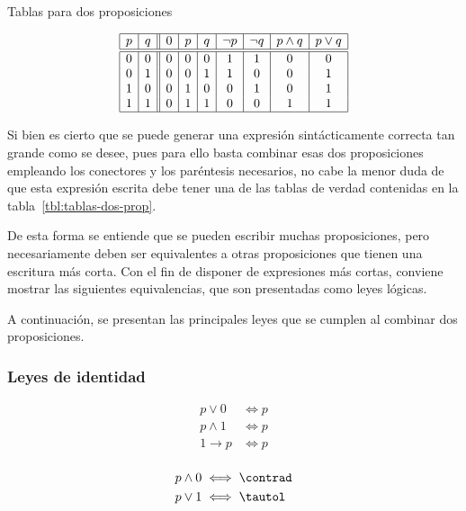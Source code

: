 \begin{table}[h]%
  \caption{Tablas para dos proposiciones}
  \label{tbl:tablas-dos-prop}%
  \centering
  $$
    \begin{array}{|c|c||c|c|c|c|c|c|c|}
      \hline
      p & q & 0 & p & q & \neg p & \neg q & p \land q & p \lor q \\
      \hline
      \hline
      0 & 0 & 0 & 0 & 0 & 1 & 1 & 0 & 0 \\
      0 & 1 & 0 & 0 & 1 & 1 & 0 & 0 & 1 \\
      1 & 0 & 0 & 1 & 0 & 0 & 1 & 0 & 1 \\
      1 & 1 & 0 & 1 & 1 & 0 & 0 & 1 & 1 \\
      \hline
    \end{array}
  $$
\end{table}

Si bien es cierto que se puede generar una expresión sintácticamente
correcta tan grande como se desee, pues para ello basta combinar esas dos
proposiciones empleando los conectores y los paréntesis necesarios, no cabe
la menor duda de que esta expresión escrita debe tener una de las tablas de
verdad contenidas en la tabla~\ref{tbl:tablas-dos-prop}.

De esta forma se entiende que se pueden escribir muchas proposiciones, pero
necesariamente deben ser equivalentes a otras proposiciones que tienen una
escritura más corta. Con el fin de disponer de expresiones más cortas,
conviene mostrar las siguientes equivalencias, que son presentadas como
leyes lógicas.

A continuación, se presentan las principales leyes que se cumplen al
combinar dos proposiciones.





\subsubsection{Leyes de identidad}

\begin{minipage}[t]{.45\textwidth}
  \centering
  \begin{align*}
    p \lor 0 &\iff p \\
    p \land 1 &\iff p \\
    1 \rightarrow p &\iff p \\
  \end{align*}
\end{minipage}
\begin{minipage}[t]{.45\textwidth}
  \centering
  \begin{align*}
    p \land 0 &\iff \contrad \\
    p \lor 1 &\iff \tautol \\
  \end{align*}
\end{minipage}




